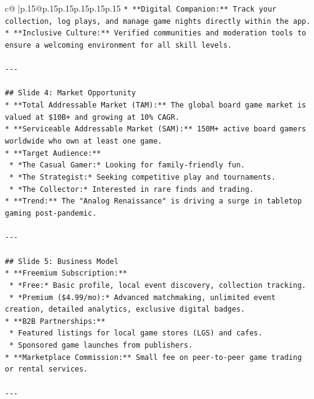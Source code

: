 \documentclass{article}
\begin{document}
{\begin{supertabular}{c@{$\;$}|p{.15\linewidth}@{}p{.15\linewidth}p{.15\linewidth}p{.15\linewidth}p{.15\linewidth}p{.15\linewidth}}
{{{\texttt{*   **Digital Companion:** Track your collection, log plays, and manage game nights directly within the app.} \\
\texttt{*   **Inclusive Culture:** Verified communities and moderation tools to ensure a welcoming environment for all skill levels.} \\
\\ 
\texttt{{-}{-}{-}} \\
\\ 
\texttt{\#\# Slide 4: Market Opportunity} \\
\texttt{*   **Total Addressable Market (TAM):** The global board game market is valued at \$10B+ and growing at 10\% CAGR.} \\
\texttt{*   **Serviceable Addressable Market (SAM):** 150M+ active board gamers worldwide who own at least one game.} \\
\texttt{*   **Target Audience:**} \\
\texttt{    *   *The Casual Gamer:* Looking for family{-}friendly fun.} \\
\texttt{    *   *The Strategist:* Seeking competitive play and tournaments.} \\
\texttt{    *   *The Collector:* Interested in rare finds and trading.} \\
\texttt{*   **Trend:** The "Analog Renaissance" is driving a surge in tabletop gaming post{-}pandemic.} \\
\\ 
\texttt{{-}{-}{-}} \\
\\ 
\texttt{\#\# Slide 5: Business Model} \\
\texttt{*   **Freemium Subscription:**} \\
\texttt{    *   *Free:* Basic profile, local event discovery, collection tracking.} \\
\texttt{    *   *Premium (\$4.99/mo):* Advanced matchmaking, unlimited event creation, detailed analytics, exclusive digital badges.} \\
\texttt{*   **B2B Partnerships:**} \\
\texttt{    *   Featured listings for local game stores (LGS) and cafes.} \\
\texttt{    *   Sponsored game launches from publishers.} \\
\texttt{*   **Marketplace Commission:** Small fee on peer{-}to{-}peer game trading or rental services.} \\
\\ 
\texttt{{-}{-}{-}} \\
}}}
\end{supertabular}}
\end{document}
